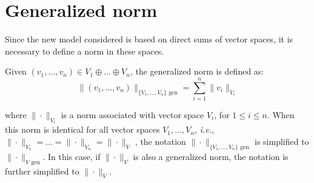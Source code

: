 \section{Generalized norm}
Since the new model considered is based on direct sums of vector spaces, it is necessary to define a norm in these spaces. 
\begin{definition}  \label{def:gen_norm}
  Given $(v_1, \ldots, v_n) \in V_1 \oplus \ldots \oplus V_n$, the generalized norm is defined as:
  \begin{equation}
    \|(v_1, \ldots, v_n)\|_{\{V_1,\ldots, V_n\} \text{ gen}} = \sum_{i=1}^{n} \|v_i\|_{V_i} 
  \end{equation}
\end{definition}
where $\| \cdot \|_{V_i}$ is a norm associated with vector space $V_i$, for $1\leq i \leq n$.  When this norm is identical for all vector spaces $V_1, \ldots, V_n$, \textit{i.e.}, $\| \cdot \|_{V_1} = \ldots=\| \cdot \|_{V_n} =\| \cdot \|_{V}$ , the notation $\| \cdot \|_{\{V_1, \ldots, V_n\} \text{ gen}}$ is simplified to $\| \cdot \|_{V \text{ gen}}$. In this case, if $\| \cdot \|_{V}$ is also a generalized norm, the notation is further simplified to $\| \cdot \|_{V}$.

